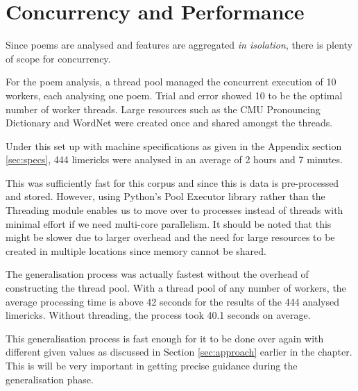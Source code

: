 \section{Concurrency and Performance}
\label{sec:interpret-perf}

Since poems are analysed and features are aggregated \textit{in isolation}, there is plenty of scope for concurrency.

For the poem analysis, a thread pool managed the concurrent execution of 10 workers, each analysing one poem. Trial and error showed 10 to be the optimal number of worker threads. Large resources such as the CMU Pronouncing Dictionary and WordNet were created once and shared amongst the threads.

Under this set up with machine specifications as given in the Appendix section \ref{sec:specs}, 444 limericks were analysed in an average of 2 hours and 7 minutes.

This was sufficiently fast for this corpus and since this is data is pre-processed and stored. However, using Python's Pool Executor library rather than the Threading module enables us to move over to processes instead of threads with minimal effort if we need multi-core parallelism. It should be noted that this might be slower due to larger overhead and the need for large resources to be created in multiple locations since memory cannot be shared.

The generalisation process was actually fastest without the overhead of constructing the thread pool. With a thread pool of any number of workers, the average processing time is above 42 seconds for the results of the 444 analysed limericks. Without threading, the process took 40.1 seconds on average.

This generalisation process is fast enough for it to be done over again with different given values as discussed in Section \ref{sec:approach} earlier in the chapter. This is will be very important in getting precise guidance during the generalisation phase. 



